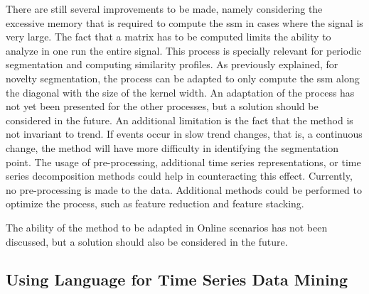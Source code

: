 There are still several improvements to be made, namely considering the excessive memory that is required to compute the \gls{ssm} in cases where the signal is very large. The fact that a matrix has to be computed limits the ability to analyze in one run the entire signal. This process is specially relevant for periodic segmentation and computing similarity profiles. As previously explained, for novelty segmentation, the process can be adapted to only compute the \gls{ssm} along the diagonal with the size of the kernel width. An adaptation of the process has not yet been presented for the other processes, but a solution should be considered in the future. An additional limitation is the fact that the method is not invariant to trend. If events occur in slow trend changes, that is, a continuous change, the method will have more difficulty in identifying the segmentation point. The usage of pre-processing, additional time series representations, or time series decomposition methods could help in counteracting this effect. Currently, no pre-processing is made to the data. Additional methods could be performed to optimize the process, such as feature reduction and feature stacking.
\par
The ability of the method to be adapted in Online scenarios has not been discussed, but a solution should also be considered in the future.

\subsection{Using Language for Time Series Data Mining}

